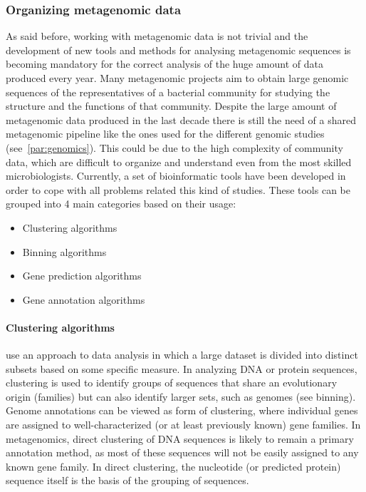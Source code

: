 \subsubsection*{Organizing metagenomic data}
As said before, working with metagenomic data is not trivial and the development of new tools and methods for analysing metagenomic sequences is becoming mandatory for the correct analysis of the huge amount of data produced every year. Many metagenomic projects aim to obtain large genomic sequences of the representatives of a bacterial community for studying the structure and the functions of that community. Despite the large amount of metagenomic data produced in the last decade there is still the need of a shared metagenomic pipeline like the ones used for the different genomic studies (see~\ref{par:genomics}). This could be due to the high complexity of community data, which are difficult to organize and understand even from the most skilled microbiologists. Currently, a set of bioinformatic tools have been developed in order to cope with all problems related this kind of studies. These tools can be grouped into 4 main categories based on their usage:
\vspace{-3mm}
\begin{itemize}[nosep]
\item Clustering algorithms
\item Binning algorithms
\item Gene prediction algorithms
\item Gene annotation algorithms
\end{itemize}

\paragraph{Clustering algorithms} use an approach to data analysis in which a large dataset is divided into distinct subsets based on some specific measure. In analyzing DNA or protein sequences, clustering is used to identify groups of sequences that share an evolutionary origin (families) but can also identify larger sets, such as genomes (see binning). Genome annotations can be viewed as form of clustering, where individual genes are assigned to well-characterized (or at least previously known) gene families. In metagenomics, direct clustering of DNA sequences is likely to remain a primary annotation method, as most of these sequences will not be easily assigned to any known gene family. In direct clustering, the nucleotide (or predicted protein) sequence itself is the basis of the grouping of sequences.\\

